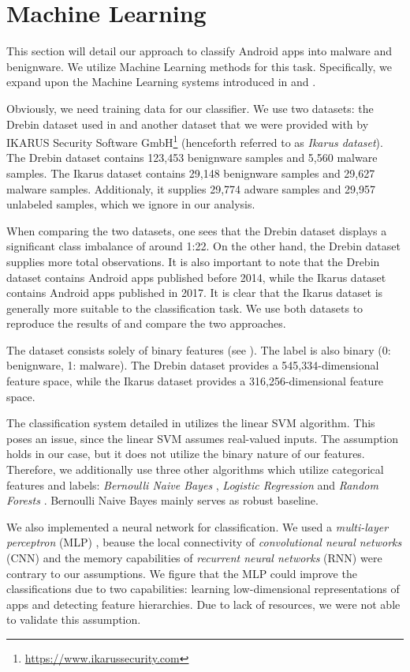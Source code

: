 \section{Machine Learning}
This section will detail our approach to classify Android apps into malware and benignware. We utilize Machine Learning methods for this task. Specifically, we expand upon the Machine Learning systems introduced in \cite{drebin} and \cite{7917369}.

Obviously, we need training data for our classifier. We use two datasets: the Drebin dataset used in \cite{drebin} and another dataset that we were provided with by IKARUS Security Software GmbH\footnote{\url{https://www.ikarussecurity.com}} (henceforth referred to as \emph{Ikarus dataset}). The Drebin dataset contains 123,453 benignware samples and 5,560 malware samples. The Ikarus dataset contains 29,148 benignware samples and 29,627 malware samples. Additionaly, it supplies 29,774 adware samples and 29,957 unlabeled samples, which we ignore in our analysis.

When comparing the two datasets, one sees that the Drebin dataset displays a significant class imbalance of around 1:22. On the other hand, the Drebin dataset supplies more total observations. It is also important to note that the Drebin dataset contains Android apps published before 2014, while the Ikarus dataset contains Android apps published in 2017. It is clear that the Ikarus dataset is generally more suitable to the classification task. We use both datasets to reproduce the results of \cite{drebin} and compare the two approaches.

The dataset consists solely of binary features (see ). The label is also binary (0: benignware, 1: malware). The Drebin dataset provides a 545,334-dimensional feature space, while the Ikarus dataset provides a 316,256-dimensional feature space.

The classification system detailed in \cite{drebin} utilizes the linear SVM algorithm. This poses an issue, since the linear SVM assumes real-valued inputs. The assumption holds in our case, but it does not utilize the binary nature of our features. Therefore, we additionally use three other algorithms which utilize categorical features and labels: \emph{Bernoulli Naive Bayes} \cite{Manning:2008:IIR:1394399}, \emph{Logistic Regression} \cite{10.2307/2983890} and \emph{Random Forests} \cite{598994}. Bernoulli Naive Bayes mainly serves as robust baseline.

We also implemented a neural network for classification. We used a \emph{multi-layer perceptron} (MLP) \cite{rosenblatt1958}, beause the local connectivity of \emph{convolutional neural networks} (CNN) \cite{Fukushima1980} and the memory capabilities of \emph{recurrent neural networks} (RNN) \cite{doi:10.1162/neco.1997.9.8.1735} were contrary to our assumptions. We figure that the MLP could improve the classifications due to two capabilities: learning low-dimensional representations of apps and detecting feature hierarchies. Due to lack of resources, we were not able to validate this assumption.
